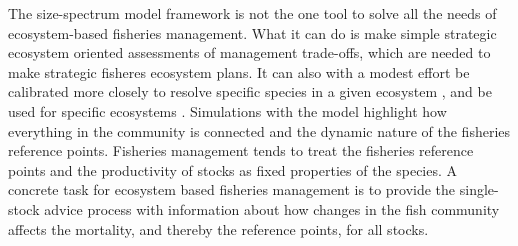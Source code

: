 The size-spectrum model framework is not the one tool to solve all the needs of ecosystem-based fisheries management.  What it can do is make simple strategic ecosystem oriented assessments of management trade-offs, which are needed to make strategic fisheres ecosystem plans.  It can also with a modest effort be calibrated more closely to resolve specific species in a given ecosystem , and be used for specific ecosystems \citep{Jacobsen2017}.   Simulations with the model highlight how everything in the community is connected and the dynamic nature of the fisheries reference points.  Fisheries management tends to treat the fisheries reference points and the productivity of stocks as fixed properties of the species.  A concrete task for ecosystem based fisheries management is to provide the single-stock advice process with information about how changes in the fish community affects the mortality, and thereby the reference points, for all stocks.
